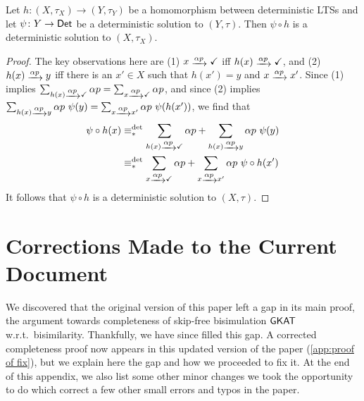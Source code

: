 \documentclass[orivec,envcountsect,envcountsame]{llncs}
\begin{document}
\begin{lemma}%
	\label{lem:homoms_preserve_det_solutions}
	Let \(h\colon (X,\tau_X) \to (Y,\tau_Y)\) be a homomorphism between deterministic LTSs and let \(\psi\colon Y \to \mathsf{Det}\) be a deterministic solution to \((Y,\tau)\).
	Then \(\psi\circ h\) is a deterministic solution to \((X,\tau_X)\).
\end{lemma}

\begin{proof}
	The key observations here are (1) \(x \tr{\alpha p} \checkmark\) iff \(h(x) \tr{\alpha p} \checkmark\), and (2) \(h(x) \tr{\alpha p} y\) iff there is an \(x' \in X\) such that \(h(x') = y\) and \(x \tr{\alpha p} x'\).
	Since (1) implies \(\sum_{h(x)\tr{\alpha p} \checkmark} \alpha p = \sum_{x\tr{\alpha p} \checkmark} \alpha p\), and since (2) implies \(\sum_{h(x)\tr{\alpha p} y} \alpha p~\psi(y) = \sum_{x\tr{\alpha p} x'} \alpha p~\psi(h(x'))\), we find that
	\begin{align*}
		\psi\circ h(x)
		&\equiv_*^{\det} \sum_{h(x)\tr{\alpha p} \checkmark} \alpha p + \sum_{h(x)\tr{\alpha p} y} \alpha p~\psi(y) \\
		&\equiv_*^{\det} \sum_{x\tr{\alpha p} \checkmark} \alpha p + \sum_{x\tr{\alpha p} x'} \alpha p~\psi\circ h(x')
	\end{align*}
	It follows that \(\psi\circ h\) is a deterministic solution to \((X, \tau)\).
\end{proof}


\section{Corrections Made to the Current Document}%
\label{app:changes}

We discovered that the original version of this paper left a gap in its main proof, the argument towards completeness of skip-free bisimulation \(\textsf{GKAT}\) w.r.t.~bisimilarity.
Thankfully, we have since filled this gap.
A corrected completeness proof now appears in this updated version of the paper (\cref{app:proof of fix}), but we explain here the gap and how we proceeded to fix it. At the end of this appendix, we also list some other minor changes we took the opportunity to do which correct a few other small errors and typos in the paper.
\end{document}
